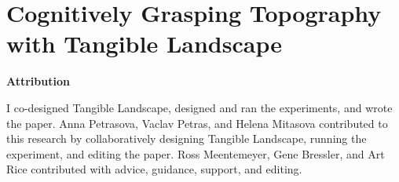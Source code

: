 \chapter{Cognitively Grasping Topography with Tangible Landscape}
\label{chap-four}



\textbf{Attribution}

I co-designed Tangible Landscape,
designed and ran the experiments,
and wrote the paper.
%
Anna Petrasova, Vaclav Petras, and Helena Mitasova
contributed to this research by
collaboratively designing Tangible Landscape,
running the experiment,
and editing the paper.
%
Ross Meentemeyer, Gene Bressler, and Art Rice
contributed with advice, guidance, support, and editing.

\vfil
\pagebreak

%